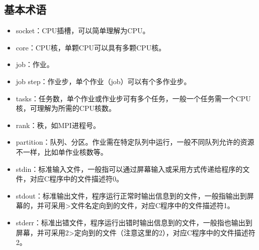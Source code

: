 \documentclass[a4paper,12pt,english]{sphinxmanual}
\begin{document}
\subsection{基本术语}
\label{\detokenize{slurm/slurm:id5}}\begin{itemize}
\item {} 
\sphinxAtStartPar
socket：CPU插槽，可以简单理解为CPU。

\item {} 
\sphinxAtStartPar
core：CPU核，单颗CPU可以具有多颗CPU核。

\item {} 
\sphinxAtStartPar
job：作业。

\item {} 
\sphinxAtStartPar
job step：作业步，单个作业（job）可以有个多作业步。

\item {} 
\sphinxAtStartPar
tasks：任务数，单个作业或作业步可有多个任务，一般一个任务需一个CPU核，可理解为所需的CPU核数。

\item {} 
\sphinxAtStartPar
rank：秩，如MPI进程号。

\item {} 
\sphinxAtStartPar
partition：队列、分区。作业需在特定队列中运行，一般不同队列允许的资源不一样，比如单作业核数等。

\item {} 
\sphinxAtStartPar
stdin：标准输入文件，一般指可以通过屏幕输入或采用方式传递给程序的文件，对应C程序中的文件描述符0。

\item {} 
\sphinxAtStartPar
stdout：标准输出文件，程序运行正常时输出信息到的文件，一般指输出到屏幕的，并可采用>文件名定向到的文件，对应C程序中的文件描述符1。

\item {} 
\sphinxAtStartPar
stderr：标准出错文件，程序运行出错时输出信息到的文件，一般指也输出到屏幕，并可采用2>定向到的文件（注意这里的2），对应C程序中的文件描述符2。

\end{itemize}
\end{document}
